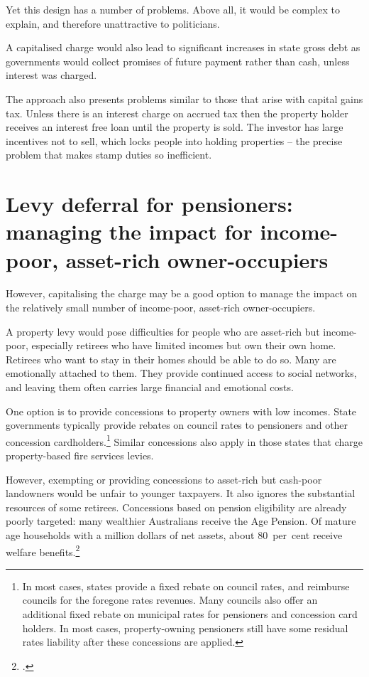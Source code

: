 \documentclass[twoside,english]{Dianab5ona4portrait}
\begin{document}
Yet this design has a number of problems. Above all, it would be complex to explain, and therefore unattractive to politicians. 

A capitalised charge would also lead to significant increases in state gross debt as governments would collect promises of future payment rather than cash, unless interest was charged. 

The approach also presents problems similar to those that arise with capital gains tax. Unless there is an interest charge on accrued tax then the property holder receives an interest free loan until the property is sold. The investor has large incentives not to sell, which locks people into holding properties – the precise problem that makes stamp duties so inefficient. 


\section{Levy deferral for pensioners: managing the impact for income-poor, asset-rich owner-occupiers\label{sec:PROP-6-5}}
However, capitalising the charge may be a good option to manage the impact on the relatively small number of income-poor, asset-rich owner-occupiers.

A property levy would pose difficulties for people who are asset-rich but income-poor, especially retirees who have limited incomes but own their own home. Retirees who want to stay in their homes should be able to do so. Many are emotionally attached to them. They provide continued access to social networks, and leaving them often carries large financial and emotional costs. 

One option is to provide concessions to property owners with low incomes. State governments typically provide rebates on council rates to pensioners and other concession cardholders.\footnote{In most cases, states provide a fixed rebate on council rates, and reimburse councils for the foregone rates revenues. Many councils also offer an additional fixed rebate on municipal rates for pensioners and concession card holders. In most cases, property-owning pensioners still have some residual rates liability after these concessions are applied.}  Similar concessions also apply in those states that charge property-based fire services levies. 

However, exempting or providing concessions to asset-rich but cash-poor landowners would be unfair to younger taxpayers. It also ignores the substantial resources of some retirees. Concessions based on pension eligibility are already poorly targeted: many wealthier Australians receive the Age Pension. Of mature age households with a million dollars of net assets, about 80~per~cent receive welfare benefits.\footcite[][37]{DaleyMcGannonSavageEtAl2013BalancingBudgets}  
\end{document}
